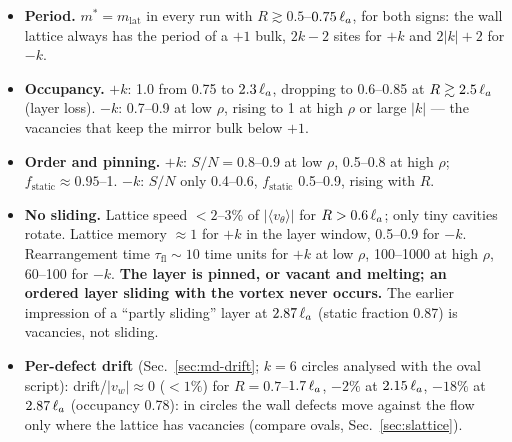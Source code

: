 \begin{itemize}
  \item \textbf{Period.} $m^*=m_\mathrm{lat}$ in every run with $R\gtrsim0.5$--$0.75\,\ell_a$, for both signs: the wall lattice
        always has the period of a $+1$ bulk, $2k-2$ sites for $+k$ and $2|k|+2$ for $-k$.
  \item \textbf{Occupancy.} $+k$: 1.0 from 0.75 to $2.3\,\ell_a$, dropping to 0.6--0.85 at $R\gtrsim2.5\,\ell_a$ (layer loss).
        $-k$: 0.7--0.9 at low $\rho$, rising to 1 at high $\rho$ or large $|k|$ --- the vacancies that keep the mirror bulk below $+1$.
  \item \textbf{Order and pinning.} $+k$: $S/N=0.8$--0.9 at low $\rho$, 0.5--0.8 at high $\rho$; $f_\mathrm{static}\approx0.95$--1.
        $-k$: $S/N$ only 0.4--0.6, $f_\mathrm{static}$ 0.5--0.9, rising with $R$.
  \item \textbf{No sliding.} Lattice speed $<2$--3\% of $|\langle v_\theta\rangle|$ for $R>0.6\,\ell_a$; only tiny cavities rotate.
        Lattice memory $\approx1$ for $+k$ in the layer window, 0.5--0.9 for $-k$. Rearrangement time $\tau_\mathrm{fl}\sim10$
        time units for $+k$ at low $\rho$, 100--1000 at high $\rho$, 60--100 for $-k$. \textbf{The layer is pinned, or vacant and
        melting; an ordered layer sliding with the vortex never occurs.} The earlier impression of a ``partly sliding'' layer at
        $2.87\,\ell_a$ (static fraction 0.87) is vacancies, not sliding.
  \item \textbf{Per-defect drift} (Sec.~\ref{sec:md-drift}; $k=6$ circles analysed with the oval script): drift/$|v_w|\approx0$
        ($<1\%$) for $R=0.7$--$1.7\,\ell_a$, $-2\%$ at $2.15\,\ell_a$, $-18\%$ at $2.87\,\ell_a$ (occupancy 0.78): in circles the wall defects
        move against the flow only where the lattice has vacancies (compare ovals, Sec.~\ref{sec:slattice}).
\end{itemize}
